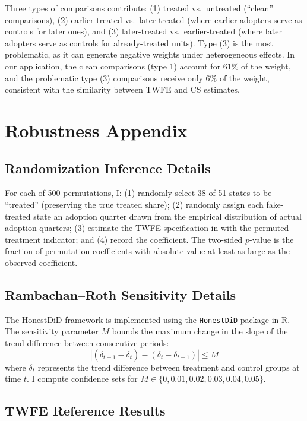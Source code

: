 \documentclass[12pt]{article}
\begin{document}
Three types of comparisons contribute: (1) treated vs.\ untreated (``clean'' comparisons), (2) earlier-treated vs.\ later-treated (where earlier adopters serve as controls for later ones), and (3) later-treated vs.\ earlier-treated (where later adopters serve as controls for already-treated units). Type (3) is the most problematic, as it can generate negative weights under heterogeneous effects. In our application, the clean comparisons (type 1) account for 61\% of the weight, and the problematic type (3) comparisons receive only 6\% of the weight, consistent with the similarity between TWFE and CS estimates.

\section{Robustness Appendix}\label{app:robust}

\subsection{Randomization Inference Details}

For each of 500 permutations, I: (1) randomly select 38 of 51 states to be ``treated'' (preserving the true treated share); (2) randomly assign each fake-treated state an adoption quarter drawn from the empirical distribution of actual adoption quarters; (3) estimate the TWFE specification in  with the permuted treatment indicator; and (4) record the coefficient. The two-sided $p$-value is the fraction of permutation coefficients with absolute value at least as large as the observed coefficient.

\subsection{Rambachan--Roth Sensitivity Details}

The HonestDiD framework is implemented using the \texttt{HonestDiD} package in R. The sensitivity parameter $M$ bounds the maximum change in the slope of the trend difference between consecutive periods:
\begin{equation}
    |(\delta_{t+1} - \delta_t) - (\delta_t - \delta_{t-1})| \leq M
\end{equation}
where $\delta_t$ represents the trend difference between treatment and control groups at time $t$. I compute confidence sets for $M \in \{0, 0.01, 0.02, 0.03, 0.04, 0.05\}$.

\subsection{TWFE Reference Results}
\end{document}
